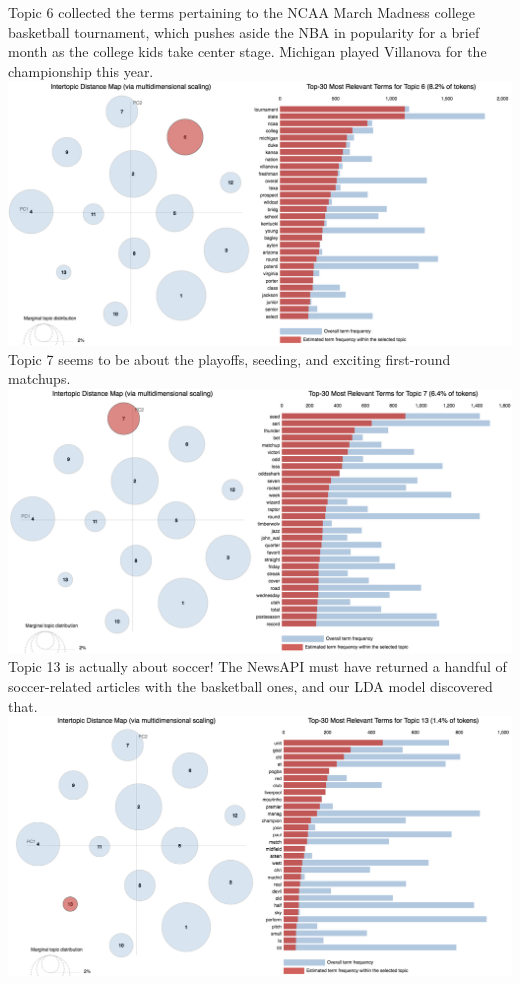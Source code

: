 \documentclass[11pt]{article}
\begin{document}
Topic 6 collected the terms pertaining to the NCAA March Madness college basketball tournament, which pushes aside the NBA in popularity for a brief month as the college kids take center stage. Michigan played Villanova for the championship this year. \\
\includegraphics[width=470pt]{6.png} \\

Topic 7 seems to be about the playoffs, seeding, and exciting first-round matchups.  \\
\includegraphics[width=470pt]{7.png} \\

Topic 13 is actually about soccer!  The NewsAPI must have returned a handful of soccer-related articles with the basketball ones, and our LDA model discovered that. \\
\includegraphics[width=470pt]{13.png} \\
\end{document}
